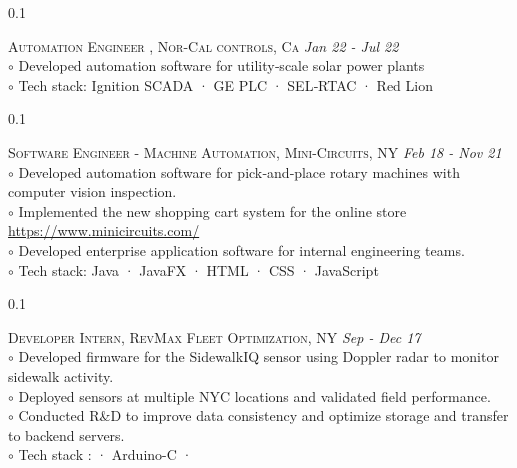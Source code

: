 \documentclass[a4paper]{article}
\begin{document}

\begin{spacing}{0.1}
\end{spacing}

%
\faBriefcase \textsc	{	 	Automation Engineer	, Nor-Cal controls, Ca										} \hfill \emph {Jan 22 - Jul 22		}	\\
{\color{previousWork}
		{	$\circ$	{	Developed automation software for utility‑scale solar power plants											}	}	\\
		{	$\circ$	{	Tech stack: Ignition SCADA · GE PLC · SEL‑RTAC · Red Lion												}	}	\\
}
		

		
%
\begin{spacing}{0.1}
\end{spacing}
\faBriefcase \textsc	{		Software Engineer - Machine Automation, Mini-Circuits, NY										} \hfill \emph {Feb 18 - Nov 21		}	\\
{\color{previousWork}
		{	$\circ$	{	Developed automation software for pick‑and‑place rotary machines with computer vision inspection.									}	}	\\
		{	$\circ$	{	Implemented the new shopping cart system for the online store \href{https://www.minicircuits.com/}{https://www.minicircuits.com/}			}	}	\\
		{	$\circ$	{	Developed enterprise application software for internal engineering teams.														}	}	\\
		{	$\circ$	{	Tech stack: Java · JavaFX · HTML · CSS · JavaScript																	}	}	\\
}		

		
%
\begin{spacing}{0.1}
\end{spacing}
\faBriefcase \textsc	{	 	Developer Intern, RevMax Fleet Optimization, NY															} \hfill \emph {Sep - Dec 17	}	\\
{\color{previousWork}
		{	$\circ$	{	Developed firmware for the SidewalkIQ sensor using Doppler radar to monitor sidewalk activity.											}	}	\\
		{	$\circ$	{	Deployed sensors at multiple NYC locations and validated field performance.															}	}	\\
		{	$\circ$	{	Conducted R\&D to improve data consistency and optimize storage and transfer to backend servers.											}	}	\\
		{	$\circ$	{	Tech stack : · Arduino-C · 																									}	}	\\
}
\end{document}
